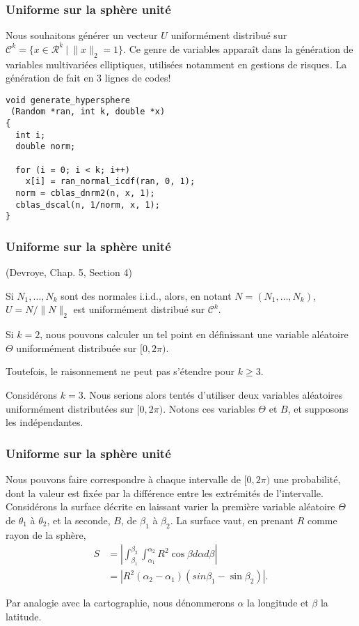 \documentclass[t,usepdftitle=false]{beamer}
\begin{document}
\begin{frame}[fragile]
\frametitle{Uniforme sur la sphère unité}

Nous souhaitons générer un vecteur $U$ uniformément distribué sur
$\mathcal{C}^k = \lbrace x \in \mathcal{R}^k\ |\ \|x\|_2 = 1 \rbrace$.
Ce genre de variables apparaît dans la génération de variables
multivariées elliptiques, utilisées notamment en gestions de risques.
La génération de fait en 3 lignes de codes!

\begin{lstlisting}
void generate_hypersphere
 (Random *ran, int k, double *x)
{
  int i;
  double norm;

  for (i = 0; i < k; i++)
    x[i] = ran_normal_icdf(ran, 0, 1);
  norm = cblas_dnrm2(n, x, 1);
  cblas_dscal(n, 1/norm, x, 1);
} 
\end{lstlisting}

\end{frame}

\begin{frame}[fragile]
\frametitle{Uniforme sur la sphère unité}

(Devroye, Chap. 5, Section 4)

Si $N_1,\ldots,N_k$ sont des normales i.i.d., alors, en notant $N = (
N_1, \ldots, N_k )$, $U = N/\|N\|_2$ est uniformément distribué
sur $\mathcal{C}^k$.

\mbox{}

Si $k = 2$, nous pouvons calculer un tel point en définissant une variable aléatoire $\Theta$ uniformément distribuée sur $[0,2\pi)$.

\mbox{}

Toutefois, le raisonnement ne peut pas s'étendre pour $k \geq 3$.

\mbox{}

Considérons $k = 3$. Nous serions alors tentés d'utiliser deux variables aléatoires uniformément distributées sur $[0, 2\pi)$.
Notons ces variables $\Theta$ et $B$, et supposons les indépendantes.

\end{frame}

\begin{frame}[fragile]
\frametitle{Uniforme sur la sphère unité}

Nous pouvons faire correspondre à chaque intervalle de $[0,2\pi)$ une probabilité, dont la valeur est fixée par la différence entre les extrémités de l'intervalle.
Considérons la surface décrite en laissant varier la première variable aléatoire $\Theta$ de $\theta_1$ à $\theta_2$,
et la seconde, $B$, de $\beta_1$ à $\beta_2$.
La surface vaut, en prenant $R$ comme rayon de la sphère,
\begin{align*}
S &= \left| \int_{\beta_1}^{\beta_2} \int_{\alpha_1}^{\alpha_2} R^2\cos \beta d\alpha d\beta \right|
\\
&= \left| R^2 (\alpha_2-\alpha_1)(sin \beta_1 - \sin \beta_2) \right|.
\end{align*}

\mbox{}

Par analogie avec la cartographie, nous dénommerons $\alpha$ la longitude et $\beta$ la latitude.

\end{frame}
\end{document}
